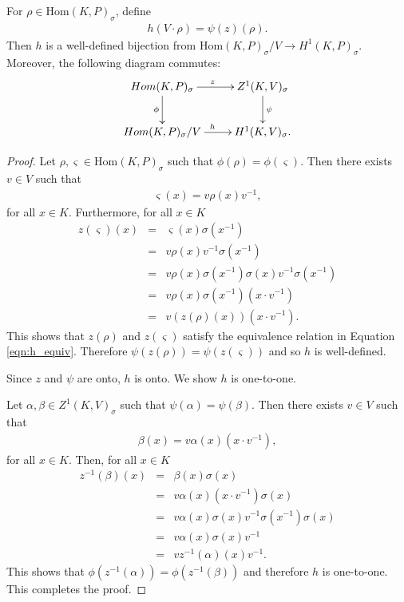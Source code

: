 \begin{lemma}
For $\rho \in \mathrm{Hom}(K, P)_\sigma$, define
\begin{eqnarray*}
h(V \cdot \rho) = \psi(z)(\rho).
\end{eqnarray*}
Then $h$ is a well-defined bijection from $\mathrm{Hom}(K, P)_\sigma / V \rightarrow H^1(K, P)_\sigma$. Moreover, the following diagram commutes:
  \begin{eqnarray*}
    \xymatrix{
    Hom(K, P)_{\sigma} \ar[r]^z \ar[d]_\phi & Z^{1}(K, V)_\sigma \ar[d]^\psi \\
    Hom(K, P)_{\sigma}/V \ar[r]^h & H^{1}(K, V)_\sigma.
    }
  \end{eqnarray*}
  \label{lem:v_h1}
\end{lemma}
\begin{proof}  
Let $\rho, \varsigma \in \mathrm{Hom}(K, P)_\sigma$ such that $\phi(\rho) = \phi(\varsigma)$. Then there exists $v \in V$ such that
\begin{eqnarray*} \varsigma(x) =  v\rho(x)v^{-1}, \end{eqnarray*}
for all $x \in K$. Furthermore, for all $x \in K$
\begin{eqnarray*}
z(\varsigma)(x) %
&=& \varsigma(x)\sigma(x^{-1}) \\
&=& v \rho(x) v^{-1} \sigma(x^{-1}) \\
&=& v \rho(x) \sigma(x^{-1})\sigma(x) v^{-1} \sigma(x^{-1}) \\
&=& v \rho(x) \sigma(x^{-1}) \left(x \cdot v^{-1}\right) \\
&=& v \left(z(\rho)(x)\right) \left(x \cdot v^{-1}\right).
\end{eqnarray*}
This shows that $z(\rho)$ and $z(\varsigma)$ satisfy the equivalence relation in Equation \ref{eqn:h_equiv}. Therefore $\psi\left(z(\rho)\right) = \psi\left(z(\varsigma)\right)$ and so $h$ is well-defined.

Since $z$ and $\psi$ are onto, $h$ is onto. We show $h$ is one-to-one.

Let $\alpha, \beta \in Z^1(K, V)_\sigma$ such that $\psi(\alpha) = \psi(\beta)$. Then there exists $v \in V$ such that
\begin{eqnarray*} \beta(x) = v \alpha(x) \left(x \cdot v^{-1}\right), \end{eqnarray*}
for all $x \in K$. Then, for all $x \in K$
\begin{eqnarray*}
z^{-1}(\beta)(x) 
&=& \beta(x)\sigma(x) \\
&=& v \alpha(x) \left(x \cdot v^{-1}\right) \sigma(x) \\
&=& v \alpha(x) \sigma(x) v^{-1} \sigma(x^{-1}) \sigma(x) \\
&=& v \alpha(x) \sigma(x) v^{-1} \\
&=& v z^{-1}(\alpha)(x) v^{-1}.
\end{eqnarray*}
This shows that $\phi\left(z^{-1}(\alpha)\right) = \phi\left(z^{-1}(\beta)\right)$ and therefore $h$ is one-to-one. This completes the proof.
\end{proof}

